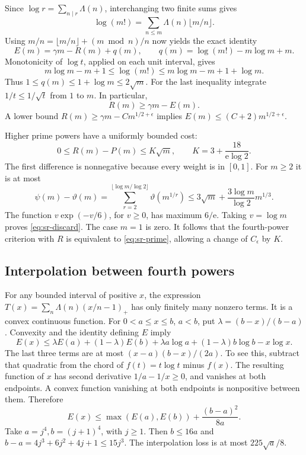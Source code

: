 Since \(\log r=\sum_{n\mid r}\Lambda(n)\), interchanging two finite sums gives
\[
 \log(m!)=\sum_{n\leq m}\Lambda(n)\lfloor m/n\rfloor .
\]
Using \(m/n=\lfloor m/n\rfloor+(m\bmod n)/n\) now yields the exact identity
\begin{equation}\label{eq:sr-factorial}
 E(m)=\gamma m-R(m)+q(m),\qquad
 q(m)=\log(m!)-m\log m+m.
\end{equation}
Monotonicity of \(\log t\), applied on each unit interval, gives
\[
 m\log m-m+1\leq\log(m!)\leq m\log m-m+1+\log m.
\]
Thus \(1\leq q(m)\leq1+\log m\leq2\sqrt m\).
For the last inequality integrate \(1/t\leq1/\sqrt t\) from \(1\) to \(m\).
In particular,
\begin{equation}\label{eq:sr-integer}
 R(m)\geq\gamma m-E(m).
\end{equation}
A lower bound \(R(m)\geq\gamma m-Cm^{1/2+\epsilon}\) implies
\(E(m)\leq(C+2)m^{1/2+\epsilon}\).

Higher prime powers have a uniformly bounded cost:
\begin{equation}\label{eq:sr-discard}
 0\leq R(m)-P(m)\leq K\sqrt m,\qquad
 K=3+\frac{18}{\mathrm e\log2}.
\end{equation}
The first difference is nonnegative because every weight is in \([0,1]\).
For \(m\geq2\) it is at most
\[
 \psi(m)-\vartheta(m)
 =\sum_{r=2}^{\lfloor\log m/\log2\rfloor}\vartheta(m^{1/r})
 \leq3\sqrt m+\frac{3\log m}{\log2}m^{1/3}.
\]
The function \(v\exp(-v/6)\), for \(v\geq0\), has maximum \(6/\mathrm e\).
Taking \(v=\log m\) proves \eqref{eq:sr-discard}. The case \(m=1\) is zero.
It follows that the fourth-power criterion with \(R\) is equivalent to
\eqref{eq:sr-prime}, allowing a change of \(C_\epsilon\) by \(K\).

\subsection{Interpolation between fourth powers}
For any bounded interval of positive \(x\), the expression
\(T(x)=\sum_n\Lambda(n)(x/n-1)_+\) has only finitely many nonzero terms.
It is a convex continuous function. For \(0<a\leq x\leq b\), \(a<b\), put
\(\lambda=(b-x)/(b-a)\). Convexity and the identity defining \(E\) imply
\[
 E(x)\leq\lambda E(a)+(1-\lambda)E(b)
 +\lambda a\log a+(1-\lambda)b\log b-x\log x.
\]
The last three terms are at most
\((x-a)(b-x)/(2a)\). To see this, subtract that quadratic from the chord
of \(f(t)=t\log t\) minus \(f(x)\). The resulting function of \(x\) has
second derivative \(1/a-1/x\geq0\), and vanishes at both endpoints.
A convex function vanishing at both endpoints is nonpositive between them.
Therefore
\begin{equation}\label{eq:sr-interpolate}
 E(x)\leq\max(E(a),E(b))+\frac{(b-a)^2}{8a}.
\end{equation}
Take \(a=j^4,b=(j+1)^4\), with \(j\geq1\).
Then \(b\leq16a\) and
\(b-a=4j^3+6j^2+4j+1\leq15j^3\). The interpolation loss is at most
\(225\sqrt a/8\).

